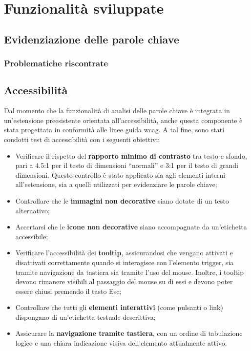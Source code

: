 \chapter{Funzionalità sviluppate}
\label{cap:funzionalità-sviluppate}

\section{Evidenziazione delle parole chiave}

\subsection{Problematiche riscontrate}

\section{Accessibilità}

\par Dal momento che la funzionalità di analisi delle parole chiave è integrata in un’estensione preesistente orientata all’accessibilità, anche questa componente è stata progettata in conformità alle linee guida \gls{wcag}. A tal fine, sono stati condotti test di accessibilità con i seguenti obiettivi:
\begin{itemize}
  \item Verificare il rispetto del \textbf{rapporto minimo di contrasto} tra testo e sfondo, pari a 4.5:1 per il testo di dimensioni “normali” e 3:1 per il testo di grandi dimensioni. Questo controllo è stato applicato sia agli elementi interni all’estensione, sia a quelli utilizzati per evidenziare le parole chiave;
  \item Controllare che le \textbf{immagini non decorative} siano dotate di un testo alternativo;
  \item Accertarsi che le \textbf{icone non decorative} siano accompagnate da un’etichetta accessibile;
  \item Verificare l’accessibilità dei \textbf{tooltip}, assicurandosi che vengano attivati e disattivati correttamente quando si interagisce con l’elemento trigger, sia tramite navigazione da tastiera sia tramite l’uso del mouse. Inoltre, i tooltip devono rimanere visibili al passaggio del mouse su di essi e devono poter essere chiusi premendo il tasto Esc;
  \item Controllare che tutti gli \textbf{elementi interattivi} (come pulsanti o link) dispongano di un’etichetta testuale descrittiva;
  \item Assicurare la \textbf{navigazione tramite tastiera}, con un ordine di tabulazione logico e una chiara indicazione visiva dell’elemento attualmente attivo.
\end{itemize}
